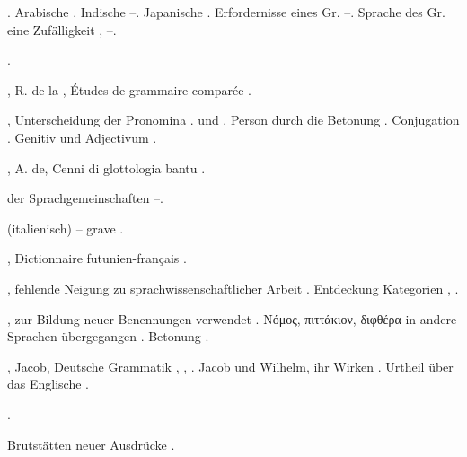 \begin{register}
. Arabische \pageref{sp.21}. Indische \pageref{sp.22}–\pageref{sp.23}. Japanische \pageref{sp.24}. Erfordernisse eines Gr. \pageref{sp.81}–\pageref{sp.82}. Sprache des Gr. eine Zufälligkeit \pageref{sp.88}, \pageref{sp.120}–\pageref{sp.121}.


 \pageref{sp.216}.

, R. de la \pageref{sp.31}, Études de grammaire comparée \pageref{sp.481}.

 \pageref{sp.150}, \pageref{sp.282} Unterscheidung der Pronomina \pageref{sp.1}. und \pageref{sp.2}. Person durch die Betonung \pageref{sp.379}. Conjugation \pageref{sp.391}.  Genitiv und Adjectivum \pageref{sp.455}.

, A. de, Cenni di glottologia bantu \pageref{sp.283}.

 der Sprachgemeinschaften \pageref{sp.56}–\pageref{sp.58}.

 (italienisch) – grave \pageref{sp.222}.

, Dictionnaire futunien-français \pageref{sp.463}.

, fehlende Neigung zu sprachwissenschaftlicher Arbeit \pageref{sp.20}. Entdeckung  Kategorien \pageref{sp.20}, \pageref{sp.113}.

, zur Bildung neuer Benennungen verwendet \pageref{sp.230}. Νόμος, πιττάκιον, διφθέρα in andere Sprachen übergegangen \pageref{sp.264}. Betonung \pageref{sp.379}.

, Jacob, Deutsche Grammatik \pageref{sp.27}, \pageref{sp.31}, \pageref{sp.122}. Jacob und Wilhelm, ihr Wirken \pageref{sp.173}. Urtheil über das Englische \pageref{sp.393}.

 \pageref{sp.349}. 

 Brutstätten neuer Ausdrücke \pageref{sp.45}.




\end{register}
